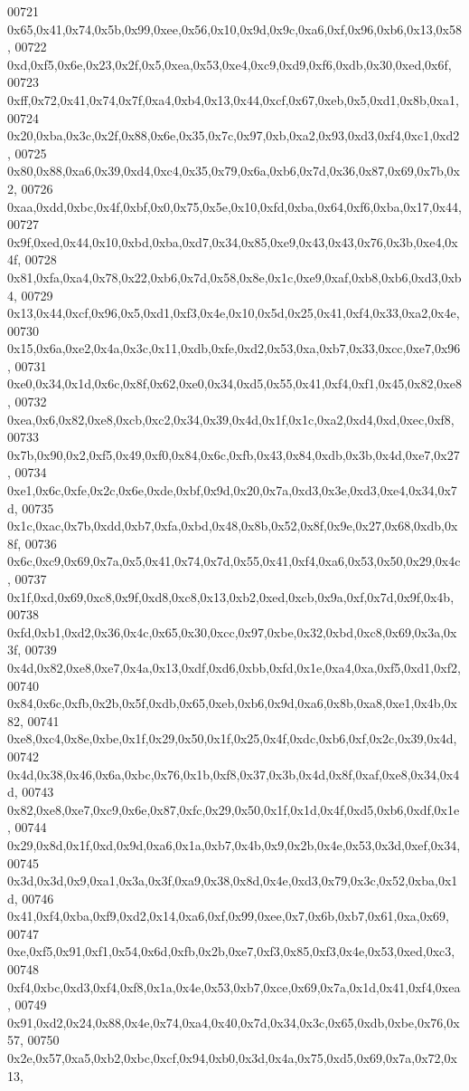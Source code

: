 \begin{DoxyCode}
00721   0x65,0x41,0x74,0x5b,0x99,0xee,0x56,0x10,0x9d,0x9c,0xa6,0xf,0x96,0xb6,0x13,0x58,
00722   0xd,0xf5,0x6e,0x23,0x2f,0x5,0xea,0x53,0xe4,0xc9,0xd9,0xf6,0xdb,0x30,0xed,0x6f,
00723   0xff,0x72,0x41,0x74,0x7f,0xa4,0xb4,0x13,0x44,0xcf,0x67,0xeb,0x5,0xd1,0x8b,0xa1,
00724   0x20,0xba,0x3c,0x2f,0x88,0x6e,0x35,0x7c,0x97,0xb,0xa2,0x93,0xd3,0xf4,0xc1,0xd2,
00725   0x80,0x88,0xa6,0x39,0xd4,0xc4,0x35,0x79,0x6a,0xb6,0x7d,0x36,0x87,0x69,0x7b,0x2,
00726   0xaa,0xdd,0xbc,0x4f,0xbf,0x0,0x75,0x5e,0x10,0xfd,0xba,0x64,0xf6,0xba,0x17,0x44,
00727   0x9f,0xed,0x44,0x10,0xbd,0xba,0xd7,0x34,0x85,0xe9,0x43,0x43,0x76,0x3b,0xe4,0x4f,
00728   0x81,0xfa,0xa4,0x78,0x22,0xb6,0x7d,0x58,0x8e,0x1c,0xe9,0xaf,0xb8,0xb6,0xd3,0xb4,
00729   0x13,0x44,0xcf,0x96,0x5,0xd1,0xf3,0x4e,0x10,0x5d,0x25,0x41,0xf4,0x33,0xa2,0x4e,
00730   0x15,0x6a,0xe2,0x4a,0x3c,0x11,0xdb,0xfe,0xd2,0x53,0xa,0xb7,0x33,0xcc,0xe7,0x96,
00731   0xe0,0x34,0x1d,0x6c,0x8f,0x62,0xe0,0x34,0xd5,0x55,0x41,0xf4,0xf1,0x45,0x82,0xe8,
00732   0xea,0x6,0x82,0xe8,0xcb,0xc2,0x34,0x39,0x4d,0x1f,0x1c,0xa2,0xd4,0xd,0xec,0xf8,
00733   0x7b,0x90,0x2,0xf5,0x49,0xf0,0x84,0x6c,0xfb,0x43,0x84,0xdb,0x3b,0x4d,0xe7,0x27,
00734   0xe1,0x6c,0xfe,0x2c,0x6e,0xde,0xbf,0x9d,0x20,0x7a,0xd3,0x3e,0xd3,0xe4,0x34,0x7d,
00735   0x1c,0xac,0x7b,0xdd,0xb7,0xfa,0xbd,0x48,0x8b,0x52,0x8f,0x9e,0x27,0x68,0xdb,0x8f,
00736   0x6c,0xc9,0x69,0x7a,0x5,0x41,0x74,0x7d,0x55,0x41,0xf4,0xa6,0x53,0x50,0x29,0x4c,
00737   0x1f,0xd,0x69,0xc8,0x9f,0xd8,0xc8,0x13,0xb2,0xed,0xcb,0x9a,0xf,0x7d,0x9f,0x4b,
00738   0xfd,0xb1,0xd2,0x36,0x4c,0x65,0x30,0xcc,0x97,0xbe,0x32,0xbd,0xc8,0x69,0x3a,0x3f,
00739   0x4d,0x82,0xe8,0xe7,0x4a,0x13,0xdf,0xd6,0xbb,0xfd,0x1e,0xa4,0xa,0xf5,0xd1,0xf2,
00740   0x84,0x6c,0xfb,0x2b,0x5f,0xdb,0x65,0xeb,0xb6,0x9d,0xa6,0x8b,0xa8,0xe1,0x4b,0x82,
00741   0xe8,0xc4,0x8e,0xbe,0x1f,0x29,0x50,0x1f,0x25,0x4f,0xdc,0xb6,0xf,0x2c,0x39,0x4d,
00742   0x4d,0x38,0x46,0x6a,0xbc,0x76,0x1b,0xf8,0x37,0x3b,0x4d,0x8f,0xaf,0xe8,0x34,0x4d,
00743   0x82,0xe8,0xe7,0xc9,0x6e,0x87,0xfc,0x29,0x50,0x1f,0x1d,0x4f,0xd5,0xb6,0xdf,0x1e,
00744   0x29,0x8d,0x1f,0xd,0x9d,0xa6,0x1a,0xb7,0x4b,0x9,0x2b,0x4e,0x53,0x3d,0xef,0x34,
00745   0x3d,0x3d,0x9,0xa1,0x3a,0x3f,0xa9,0x38,0x8d,0x4e,0xd3,0x79,0x3c,0x52,0xba,0x1d,
00746   0x41,0xf4,0xba,0xf9,0xd2,0x14,0xa6,0xf,0x99,0xee,0x7,0x6b,0xb7,0x61,0xa,0x69,
00747   0xe,0xf5,0x91,0xf1,0x54,0x6d,0xfb,0x2b,0xe7,0xf3,0x85,0xf3,0x4e,0x53,0xed,0xc3,
00748   0xf4,0xbc,0xd3,0xf4,0xf8,0x1a,0x4e,0x53,0xb7,0xce,0x69,0x7a,0x1d,0x41,0xf4,0xea,
00749   0x91,0xd2,0x24,0x88,0x4e,0x74,0xa4,0x40,0x7d,0x34,0x3c,0x65,0xdb,0xbe,0x76,0x57,
00750   0x2e,0x57,0xa5,0xb2,0xbc,0xcf,0x94,0xb0,0x3d,0x4a,0x75,0xd5,0x69,0x7a,0x72,0x13,

\end{DoxyCode}
